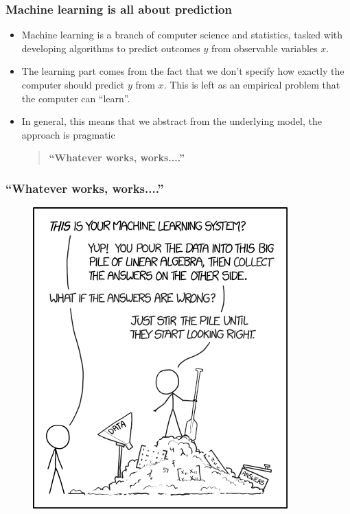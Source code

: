 \documentclass[
  shownotes,
  xcolor={svgnames},
  hyperref={colorlinks,citecolor=DarkBlue,linkcolor=andesred,urlcolor=DarkBlue}
  , aspectratio=169]{beamer}
\begin{document}
\begin{frame}
\frametitle{Machine learning is all about prediction}

\begin{itemize}
  \item Machine learning is a branch of computer science and statistics, tasked with developing algorithms to predict outcomes $y$ from observable variables $x$.
  \medskip
  \item The learning part comes from the fact that we don't specify how exactly the computer should predict $y$  from $x$. This is left as an empirical problem that the computer can “learn”.
\medskip
  \item In general, this means that we abstract from the underlying model, the approach is  pragmatic

  
  \bigskip
  \bigskip

  \pause
  \begin{quote}
  \centering
  \bf ``Whatever works, works....''
  \end{quote}
\end{itemize}
\end{frame}
\begin{frame}
\frametitle{``Whatever works, works....''}



\begin{figure}[H] \centering
            \captionsetup{justification=centering}  
            \includegraphics[scale=0.45]{figures/machine_learning}
\end{figure}


\end{frame}
\end{document}
